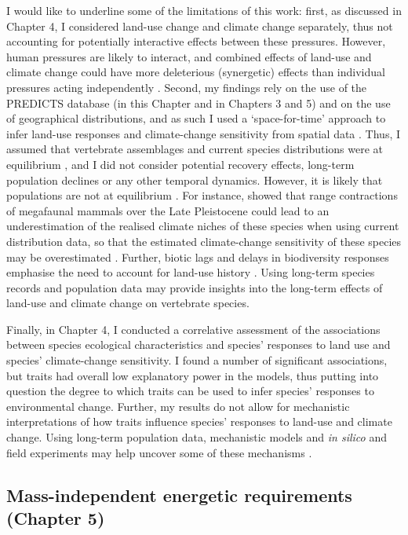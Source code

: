 I would like to underline some of the limitations of this work: first, as discussed in Chapter 4, I considered land-use change and climate change separately, thus not accounting for potentially interactive effects between these pressures. However, human pressures are likely to interact, and combined effects of land-use and climate change could have more deleterious (synergetic) effects than individual pressures acting independently \citep{Williams2020a, Williams2022}. Second, my findings rely on the use of the PREDICTS database (in this Chapter and in Chapters 3 and 5) and on the use of geographical distributions, and as such I used a `space-for-time' approach  to infer land-use responses and climate-change sensitivity from spatial data \citep{Blois2013}. Thus, I assumed that vertebrate assemblages and current species distributions were at equilibrium \citep{DePalma2018}, and I did not consider potential recovery effects, long-term population declines or any other temporal dynamics. However, it is likely that populations are not at equilibrium \citep{DePalma2018, Damgaard2019}. For instance, \citet{Sales2022} showed that range contractions of megafaunal mammals over the Late Pleistocene could lead to an underestimation of the realised climate niches of these species when using current distribution data, so that the estimated climate-change sensitivity of these species may be overestimated \citep{Sales2022}. Further, biotic lags and delays in biodiversity responses emphasise the need to account for land-use history \citep{DePalma2018, LeProvost2020}. Using long-term species records and population data may provide insights into the long-term effects of land-use and climate change on vertebrate species. 

Finally, in Chapter 4, I conducted a correlative assessment of the associations between species ecological characteristics and species' responses to land use and species' climate-change sensitivity. I found a number of significant associations, but traits had overall low explanatory power in the models, thus putting into question the degree to which traits can be used to infer species' responses to environmental change. Further, my results do not allow for mechanistic interpretations of how traits influence species' responses to land-use and climate change. Using long-term population data, mechanistic models and \textit{in silico} and field experiments may help uncover some of these mechanisms \citep{Ries2004, Boult2021}.

\subsection{Mass-independent energetic requirements (Chapter 5)}

